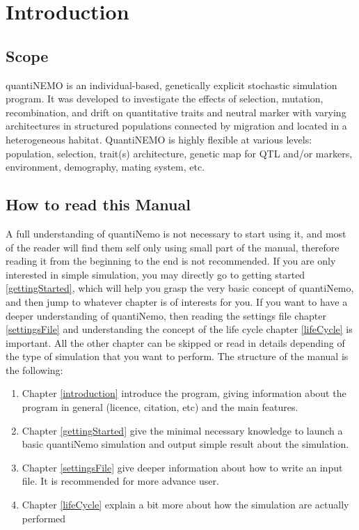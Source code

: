 \documentclass[letterpaper,12pt,oneside]{book}
\begin{document}
\frontmatter
\setcounter{tocdepth}{3}
\tableofcontents



\mainmatter
\setcounter{secnumdepth}{3}


\chapter{Introduction}\label{chap:introduction}

\section{Scope}
quantiNEMO is an individual-based, genetically explicit stochastic simulation program. It was developed to investigate the effects of selection, mutation, recombination, and drift on quantitative traits and neutral marker with varying architectures in structured populations connected by migration and located in a heterogeneous habitat. QuantiNEMO is highly flexible at various levels: population, selection, trait(s) architecture, genetic map for QTL and/or markers, environment, demography, mating system, etc.

\section{How to read this Manual}
A full understanding of quantiNemo is not necessary to start using it, and most of the reader will find them self only using small part of the manual, therefore reading it from the beginning to the end is not recommended. If you are only interested in simple simulation, you may directly go to getting started \ref{gettingStarted}, which will help you grasp the very basic concept of quantiNemo, and then jump to whatever chapter is of interests for you. If you want to have a deeper understanding of quantiNemo, then reading the settings file chapter \ref{settingsFile} and understanding the concept of the life cycle chapter \ref{lifeCycle} is important. All the other chapter can be skipped or read in details depending of the type of simulation that you want to perform. The structure of the manual is the following:
\begin{enumerate}
\item Chapter \ref{introduction} introduce the program, giving information about the program in general (licence, citation, etc) and the main features. 
\item Chapter \ref{gettingStarted} give the minimal necessary knowledge to launch a basic quantiNemo simulation and output simple result about the simulation. 
\item Chapter \ref{settingsFile} give deeper information about how to write an input file. It is recommended for more advance user. 
\item Chapter \ref{lifeCycle} explain a bit more about how the simulation are actually performed
\end{enumerate}
\end{document}
